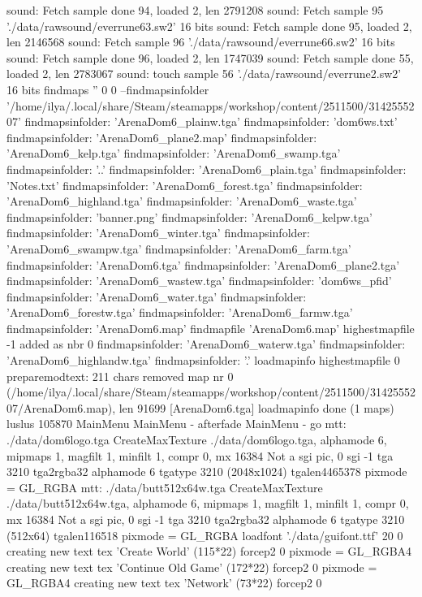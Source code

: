 sound:  Fetch sample done 94, loaded 2, len 2791208
sound: Fetch sample 95 './data/rawsound/everrune63.sw2' 16 bits
sound:  Fetch sample done 95, loaded 2, len 2146568
sound: Fetch sample 96 './data/rawsound/everrune66.sw2' 16 bits
sound:  Fetch sample done 96, loaded 2, len 1747039
sound:  Fetch sample done 55, loaded 2, len 2783067
sound: touch sample 56 './data/rawsound/everrune2.sw2' 16 bits
findmaps '' 0 0
--findmapsinfolder '/home/ilya/.local/share/Steam/steamapps/workshop/content/2511500/3142555207'
  findmapsinfolder: 'ArenaDom6_plainw.tga'
  findmapsinfolder: 'dom6ws.txt'
  findmapsinfolder: 'ArenaDom6_plane2.map'
  findmapsinfolder: 'ArenaDom6_kelp.tga'
  findmapsinfolder: 'ArenaDom6_swamp.tga'
  findmapsinfolder: '..'
  findmapsinfolder: 'ArenaDom6_plain.tga'
  findmapsinfolder: 'Notes.txt'
  findmapsinfolder: 'ArenaDom6_forest.tga'
  findmapsinfolder: 'ArenaDom6_highland.tga'
  findmapsinfolder: 'ArenaDom6_waste.tga'
  findmapsinfolder: 'banner.png'
  findmapsinfolder: 'ArenaDom6_kelpw.tga'
  findmapsinfolder: 'ArenaDom6_winter.tga'
  findmapsinfolder: 'ArenaDom6_swampw.tga'
  findmapsinfolder: 'ArenaDom6_farm.tga'
  findmapsinfolder: 'ArenaDom6.tga'
  findmapsinfolder: 'ArenaDom6_plane2.tga'
  findmapsinfolder: 'ArenaDom6_wastew.tga'
  findmapsinfolder: 'dom6ws_pfid'
  findmapsinfolder: 'ArenaDom6_water.tga'
  findmapsinfolder: 'ArenaDom6_forestw.tga'
  findmapsinfolder: 'ArenaDom6_farmw.tga'
  findmapsinfolder: 'ArenaDom6.map'
  findmapfile 'ArenaDom6.map' highestmapfile -1
  added as nbr 0
  findmapsinfolder: 'ArenaDom6_waterw.tga'
  findmapsinfolder: 'ArenaDom6_highlandw.tga'
  findmapsinfolder: '.'
loadmapinfo highestmapfile 0
preparemodtext: 211 chars removed
map nr 0 (/home/ilya/.local/share/Steam/steamapps/workshop/content/2511500/3142555207/ArenaDom6.map), len 91699 [ArenaDom6.tga]
loadmapinfo done (1 maps)
luslus 105870
MainMenu
MainMenu - afterfade
MainMenu - go
mtt: ./data/dom6logo.tga
CreateMaxTexture ./data/dom6logo.tga, alphamode 6, mipmaps 1, magfilt 1, minfilt 1, compr 0, mx 16384
Not a sgi pic, 0
sgi -1
tga 3210
tga2rgba32 alphamode 6 tgatype 3210 (2048x1024) tgalen4465378
pixmode = GL_RGBA
mtt: ./data/butt512x64w.tga
CreateMaxTexture ./data/butt512x64w.tga, alphamode 6, mipmaps 1, magfilt 1, minfilt 1, compr 0, mx 16384
Not a sgi pic, 0
sgi -1
tga 3210
tga2rgba32 alphamode 6 tgatype 3210 (512x64) tgalen116518
pixmode = GL_RGBA
loadfont './data/guifont.ttf' 20 0
creating new text tex 'Create World' (115*22) forcep2 0
pixmode = GL_RGBA4
creating new text tex 'Continue Old Game' (172*22) forcep2 0
pixmode = GL_RGBA4
creating new text tex 'Network' (73*22) forcep2 0

